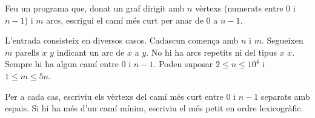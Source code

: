 

\Statement

Feu un programa que, donat un graf dirigit
amb $n$ vèrtexs (numerats entre 0 i $n-1$) i $m$ arcs,
escrigui el camí més curt per anar de 0 a $n-1$.


\Input

L'entrada consisteix en diversos casos.
Cadascun comença amb $n$ i $m$.
Segueixen $m$ parells $x$ $y$ indicant un arc de $x$ a $y$.
No hi ha arcs repetits ni del tipus $x$ $x$.
Sempre hi ha algun camí entre 0 i $n-1$.
Podeu suposar $2 \le n \le 10^4$ i $1 \le m \le 5n$.


\Output

Per a cada cas, escriviu els vèrtexs del camí més curt entre 0 i $n-1$
separats amb espais.
Si hi ha més d'un camí mínim, escriviu el més petit en ordre lexicogràfic.


\Sample

